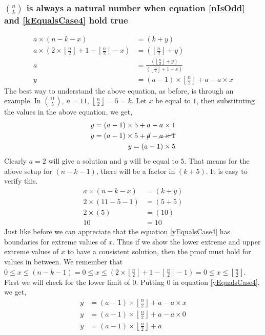 \documentclass[10pt, twoside]{article}
\newcommand*{\Combination}[2]{\binom{#1}{#2}}%
\newcommand{\floordivision}[2]{\left\lfloor \frac{#1}{#2} \right\rfloor}
\begin{document}
\subsubsection{$\Combination{n}{k}$ is always a natural number when equation \eqref{nIsOdd} and \eqref{kEqualsCase4} hold true}\label{ProofkEqualsCase4}
\begin{align}
	a \times (n-k-x) &= (k+y) \nonumber \\
	a \times (2\times \floordivision{n}{2} + 1 - \floordivision{n}{2} - x) &= (\floordivision{n}{2} + y) \nonumber \\
	a &= \frac{(\floordivision{n}{2} + y)}{(\floordivision{n}{2} + 1 - x)} \nonumber \\
	y &= (a-1)\times \floordivision{n}{2} + a - a\times x \label{yEqualsCase4}	
\end{align}
The best way to understand the above equation, as before, is through an example.\newline
In $\Combination{11}{5}$, $n=11$, $\floordivision{n}{2}=5=k$. Let $x$ be equal to $1$, then substituting the values in the above equation, we get,
\begin{align*}
	y = (a-1)\times 5 + a - a\times 1 \\
	y = (a-1)\times 5 + \cancel{a} - \cancel{a\times 1} \\
	y = (a-1)\times 5
\end{align*}
Clearly $a = 2$ will give a solution and $y$ will be equal to $5$. That means for the above setup for $(n-k-1)$, there will be a factor in $(k+5)$. It is easy to verify this.\newline
\begin{align*}
	a \times (n-k-x) &= (k+y) \nonumber \\
	2 \times (11-5-1) &= (5+5) \nonumber \\
	2 \times (5) &= (10) \nonumber \\
	10 &= 10
\end{align*}
Just like before we can appreciate that the equation \eqref{yEqualsCase4} has boundaries for extreme values of $x$. Thus if we show the lower extreme and upper extreme values of $x$ to have a consistent solution, then the proof must hold for values in between.\newline
We remember that $0 \leq x \leq (n-k-1)=0 \leq x \leq (2\times \floordivision{n}{2} + 1-\floordivision{n}{2}-1)=0 \leq x \leq \floordivision{n}{2}$. First we will check for the lower limit of $0$. Putting $0$ in equation \eqref{yEqualsCase4}, we get,
\begin{align*}
	y &= (a-1)\times \floordivision{n}{2} + a - a\times x \\
	y &= (a-1)\times \floordivision{n}{2} + a - a\times 0 \\
	y &= (a-1)\times \floordivision{n}{2} + a \\
\end{align*}
\end{document}
